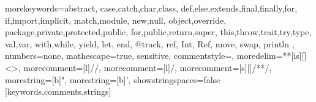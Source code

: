 \newcommand{\nonterm}[1]{\textrm{\textit{#1}}}
\newcommand{\KW}[1]{\textsf{#1}}
\newcommand{\fun}[1]{\operatorname{#1}}
\newcommand{\DOM}{\fun{dom}}
\newcommand{\CODOM}{\fun{codom}}

\newenvironment{nscenter}
{\parskip=0pt\par\nopagebreak\centering}
{\par\noindent\ignorespacesafterend}

%
{morekeywords={abstract,%
    case,catch,char,class,%
    def,else,extends,final,finally,for,%
    if,import,implicit,%
    match,module,%
    new,null,%
    object,override,%
    package,private,protected,public,%
    for,public,return,super,%
    this,throw,trait,try,type,%
    val,var,%
    with,while,%
    yield,%
    let, end, @track,%
    ref, Int, Ref, move, swap,%
    println%
  },%
  numbers=none, %
  mathescape=true,%
  sensitive,%
  commentstyle=\color{depmap},
  moredelim=**[is][\color{red}]{<}{>},%
  morecomment=[l]//,%
  morecomment=[l]/,%
  morecomment=[s][\color{ccomment}]{/*}{*/},%
  morestring=[b]",%
  morestring=[b]',%
  showstringspaces=false%
}[keywords,comments,strings]%
